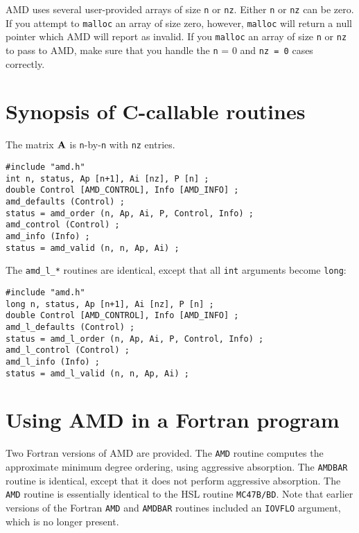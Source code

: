\documentclass[11pt]{article}
\newcommand{\m}[1]{{\bf{#1}}}       %
\begin{document}
AMD uses several user-provided arrays of size {\tt n} or {\tt nz}.
Either {\tt n} or {\tt nz} can be zero.
If you attempt to {\tt malloc} an array of size zero,
however, {\tt malloc} will return a null pointer which AMD will report
as invalid.  If you {\tt malloc} an array of
size {\tt n} or {\tt nz} to pass to AMD, make sure that you handle the
{\tt n} = 0 and {\tt nz = 0} cases correctly.

\section{Synopsis of C-callable routines}
\label{Synopsis}

The matrix $\m{A}$ is {\tt n}-by-{\tt n} with {\tt nz} entries.

{\footnotesize
\begin{verbatim}
#include "amd.h"
int n, status, Ap [n+1], Ai [nz], P [n] ;
double Control [AMD_CONTROL], Info [AMD_INFO] ;
amd_defaults (Control) ;
status = amd_order (n, Ap, Ai, P, Control, Info) ;
amd_control (Control) ;
amd_info (Info) ;
status = amd_valid (n, n, Ap, Ai) ;
\end{verbatim}
}

The {\tt amd\_l\_*} routines are identical, except that all {\tt int}
arguments become {\tt long}:

{\footnotesize
\begin{verbatim}
#include "amd.h"
long n, status, Ap [n+1], Ai [nz], P [n] ;
double Control [AMD_CONTROL], Info [AMD_INFO] ;
amd_l_defaults (Control) ;
status = amd_l_order (n, Ap, Ai, P, Control, Info) ;
amd_l_control (Control) ;
amd_l_info (Info) ;
status = amd_l_valid (n, n, Ap, Ai) ;
\end{verbatim}
}

\section{Using AMD in a Fortran program}

Two Fortran versions of AMD are provided.  The {\tt AMD} routine computes the
approximate minimum degree ordering, using aggressive absorption.  The
{\tt AMDBAR} routine is identical, except that it does not perform aggressive
absorption.  The {\tt AMD} routine is essentially identical to the HSL
routine {\tt MC47B/BD}.
Note that earlier versions of the Fortran
{\tt AMD} and {\tt AMDBAR} routines included an {\tt IOVFLO} argument,
which is no longer present.
\end{document}
